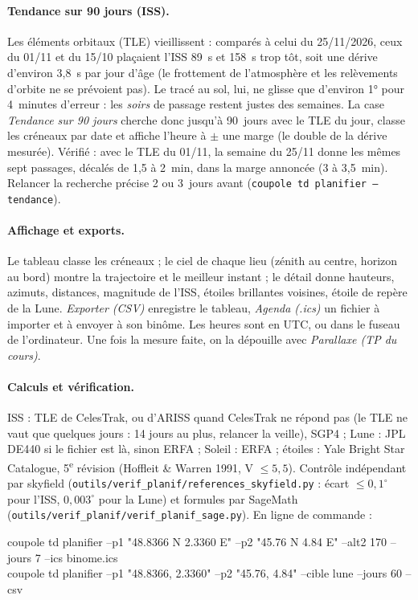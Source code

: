 \paragraph{Tendance sur 90 jours (ISS).} Les éléments orbitaux (TLE) vieillissent : comparés à celui du 25/11/2026,
ceux du 01/11 et du 15/10 plaçaient l'ISS 89~s et 158~s trop tôt, soit une dérive d'environ 3,8~s par jour d'âge (le
frottement de l'atmosphère et les relèvements d'orbite ne se prévoient pas). Le tracé au sol, lui, ne glisse que
d'environ 1° pour 4~minutes d'erreur : les \emph{soirs} de passage restent justes des semaines. La case
\emph{Tendance sur 90 jours} cherche donc jusqu'à 90~jours avec le TLE du jour, classe les créneaux par date et
affiche l'heure à $\pm$ une marge (le double de la dérive mesurée). Vérifié : avec le TLE du 01/11, la semaine du
25/11 donne les mêmes sept passages, décalés de 1,5 à 2~min, dans la marge annoncée (3 à 3,5~min). Relancer la
recherche précise 2 ou 3~jours avant (\texttt{coupole td planifier --tendance}).

\paragraph{Affichage et exports.} Le tableau classe les créneaux ; le ciel de chaque lieu (zénith au centre, horizon
au bord) montre la trajectoire et le meilleur instant ; le détail donne hauteurs, azimuts, distances, magnitude de
l'ISS, étoiles brillantes voisines, étoile de repère de la Lune. \emph{Exporter (CSV)} enregistre le tableau,
\emph{Agenda (.ics)} un fichier à importer et à envoyer à son binôme. Les heures sont en UTC, ou dans le fuseau de
l'ordinateur. Une fois la mesure faite, on la dépouille avec \emph{Parallaxe (TP du cours)}.

\paragraph{Calculs et vérification.} ISS : TLE de CelesTrak, ou d'ARISS quand CelesTrak ne répond pas (le TLE ne vaut
que quelques jours : 14 jours au plus, relancer la veille), SGP4 ; Lune : JPL DE440 si le fichier est là, sinon
ERFA ; Soleil : ERFA ; étoiles : Yale Bright Star Catalogue, 5\textsuperscript{e} révision (Hoffleit \& Warren 1991,
V $\le 5{,}5$). Contrôle indépendant par skyfield (\texttt{outils/verif\_planif/references\_skyfield.py} : écart
$\le 0{,}1^\circ$ pour l'ISS, $0{,}003^\circ$ pour la Lune) et formules par SageMath
(\texttt{outils/verif\_planif/verif\_planif\_sage.py}). En ligne de commande :
\begin{ccode}
coupole td planifier --p1 "48.8366 N 2.3360 E" --p2 "45.76 N 4.84 E" --alt2 170 --jours 7 --ics binome.ics\\
coupole td planifier --p1 "48.8366, 2.3360" --p2 "45.76, 4.84" --cible lune --jours 60 --csv
\end{ccode}


